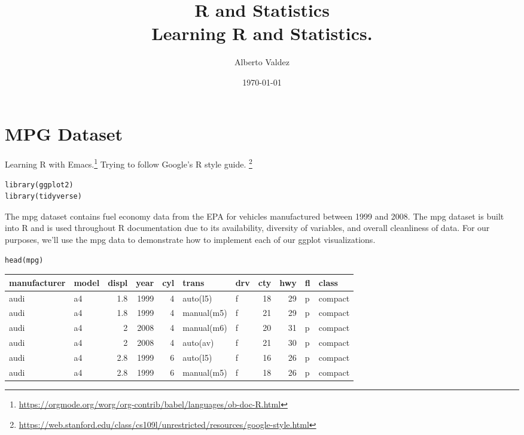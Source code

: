 \documentclass[11pt]{article}
\author{Alberto Valdez}
\date{\today}
\title{R and Statistics\\\medskip
\large Learning R and Statistics.}
\begin{document}
\maketitle
\tableofcontents



\section{MPG Dataset}
\label{sec:org05f2caf}

Learning R with Emacs.\footnote{\url{https://orgmode.org/worg/org-contrib/babel/languages/ob-doc-R.html}} Trying to follow Google's R style guide. \footnote{\url{https://web.stanford.edu/class/cs109l/unrestricted/resources/google-style.html}}

\begin{verbatim}
library(ggplot2)
library(tidyverse)
\end{verbatim}

The mpg dataset contains fuel economy data from the EPA for vehicles manufactured between 1999 and 2008. The mpg dataset is built into R and is used throughout R documentation due to its availability, diversity of variables, and overall cleanliness of data. For our purposes, we'll use the mpg data to demonstrate how to implement each of our ggplot visualizations.

\begin{verbatim}
head(mpg)
\end{verbatim}

\begin{org}
\begin{center}
\begin{tabular}{llrrrllrrll}
manufacturer & model & displ & year & cyl & trans & drv & cty & hwy & fl & class\\
\hline
audi & a4 & 1.8 & 1999 & 4 & auto(l5) & f & 18 & 29 & p & compact\\
audi & a4 & 1.8 & 1999 & 4 & manual(m5) & f & 21 & 29 & p & compact\\
audi & a4 & 2 & 2008 & 4 & manual(m6) & f & 20 & 31 & p & compact\\
audi & a4 & 2 & 2008 & 4 & auto(av) & f & 21 & 30 & p & compact\\
audi & a4 & 2.8 & 1999 & 6 & auto(l5) & f & 16 & 26 & p & compact\\
audi & a4 & 2.8 & 1999 & 6 & manual(m5) & f & 18 & 26 & p & compact\\
\end{tabular}
\end{center}
\end{org}
\end{document}
